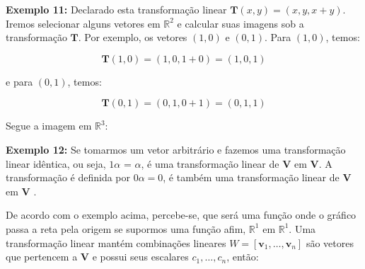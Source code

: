 \noindent\textbf{Exemplo 11:} Declarado esta transformação linear $\mathbf{T}(x, y) = (x, y, x + y)$. Iremos selecionar alguns vetores em $\mathbb{R}^2$ e calcular suas imagens sob a transformação $\mathbf{T}$. Por exemplo, os vetores $(1, 0)$ e $(0, 1)$. Para $(1, 0)$, temos: 

\begin{equation}
	\mathbf{T}(1, 0) = (1, 0, 1 +0) = (1, 0, 1)
\end{equation}

\noindent e para $(0, 1)$, temos:

\begin{equation}
\mathbf{T}(0, 1) = (0, 1, 0 + 1) = (0, 1, 1)
\end{equation}

Segue a imagem em $\mathbb{R}^3$:


\noindent\textbf{Exemplo 12:} Se tomarmos um vetor arbitrário e fazemos uma transformação linear idêntica, ou seja, $1\alpha$ = $\alpha$, é uma transformação linear de $\mathbf{V}$ em $\mathbf{V}$. A transformação é definida por $0\alpha = 0$, é também uma transformação linear de $\mathbf{V}$ em $\mathbf{V}$ \cite{hoffman1979}.

De acordo com o exemplo acima, percebe-se, que será uma função onde o gráfico passa a reta pela origem se supormos uma função afim, $\mathbb{R}^1$ em $\mathbb{R}^1$. Uma transformação linear mantém combinações lineares $W = [\mathbf{v}_1, \ldots, \mathbf{v}_n]$ são vetores que pertencem a $\mathbf{V}$ e possui seus escalares $c_1, \ldots, c_n$, então:

